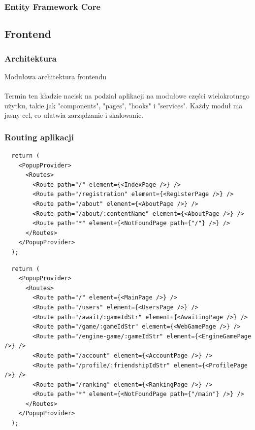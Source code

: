 \documentclass[12pt,a4paper]{article}
\begin{document}
\newpage
\subsubsection{Entity Framework Core}


\newpage
\subsection{Frontend}
\subsubsection{Architektura}
Modułowa architektura frontendu
\\\\
Termin ten kładzie nacisk na podział aplikacji na modułowe części wielokrotnego użytku, takie jak "components", "pages", "hooks" i "services". Każdy moduł ma jasny cel, co ułatwia zarządzanie i skalowanie.

\newpage
\subsubsection{Routing aplikacji}

\begin{verbatim}
  return (
    <PopupProvider>
      <Routes>
        <Route path="/" element={<IndexPage />} />
        <Route path="/registration" element={<RegisterPage />} />
        <Route path="/about" element={<AboutPage />} />
        <Route path="/about/:contentName" element={<AboutPage />} />
        <Route path="*" element={<NotFoundPage path={"/"} />} />
      </Routes>
    </PopupProvider>
  );
\end{verbatim}

\begin{verbatim}
  return (
    <PopupProvider>
      <Routes>
        <Route path="/" element={<MainPage />} />
        <Route path="/users" element={<UsersPage />} />
        <Route path="/await/:gameIdStr" element={<AwaitingPage />} />
        <Route path="/game/:gameIdStr" element={<WebGamePage />} />
        <Route path="/engine-game/:gameIdStr" element={<EngineGamePage />} />
        <Route path="/account" element={<AccountPage />} />
        <Route path="/profile/:friendshipIdStr" element={<ProfilePage />} />
        <Route path="/ranking" element={<RankingPage />} />
        <Route path="*" element={<NotFoundPage path={"/main"} />} />
      </Routes>
    </PopupProvider>
  );
\end{verbatim}
\end{document}
